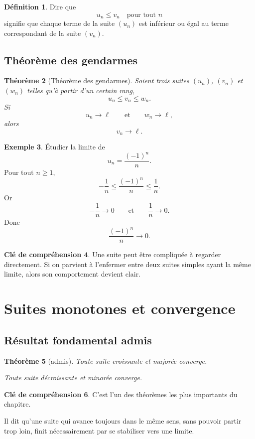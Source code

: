 \documentclass[11pt,a4paper]{article}
\theoremstyle{definition}
\newtheorem{definition}{Définition}[section]
\newtheorem{exemple}[definition]{Exemple}
\newtheorem{interpretation}[definition]{Clé de compréhension}
\theoremstyle{plain}
\newtheorem{theoreme}[definition]{Théorème}
\theoremstyle{remark}
\begin{document}
\begin{definition}
Dire que
\[
u_n\leq v_n \quad \text{pour tout } n
\]
signifie que chaque terme de la suite $(u_n)$ est inférieur ou égal au terme correspondant de la suite $(v_n)$.
\end{definition}

\subsection{Théorème des gendarmes}

\begin{theoreme}[Théorème des gendarmes]
Soient trois suites $(u_n)$, $(v_n)$ et $(w_n)$ telles qu'à partir d'un certain rang,
\[
u_n\leq v_n\leq w_n.
\]
Si
\[
u_n\to \ell
\qquad \text{et} \qquad
w_n\to \ell,
\]
alors
\[
v_n\to \ell.
\]
\end{theoreme}

\begin{exemple}
Étudier la limite de
\[
u_n=\frac{(-1)^n}{n}.
\]
Pour tout $n\geq1$,
\[
-\frac1n\leq \frac{(-1)^n}{n}\leq \frac1n.
\]
Or
\[
-\frac1n\to0
\qquad \text{et} \qquad
\frac1n\to0.
\]
Donc
\[
\frac{(-1)^n}{n}\to0.
\]
\end{exemple}

\begin{interpretation}
Une suite peut être compliquée à regarder directement. Si on parvient à l'enfermer entre deux suites simples ayant la même limite, alors son comportement devient clair.
\end{interpretation}

\section{Suites monotones et convergence}

\subsection{Résultat fondamental admis}

\begin{theoreme}[admis]
Toute suite croissante et majorée converge.

Toute suite décroissante et minorée converge.
\end{theoreme}

\begin{interpretation}
C'est l'un des théorèmes les plus importants du chapitre.  

Il dit qu'une suite qui avance toujours dans le même sens, sans pouvoir partir trop loin, finit nécessairement par se stabiliser vers une limite.
\end{interpretation}
\end{document}
